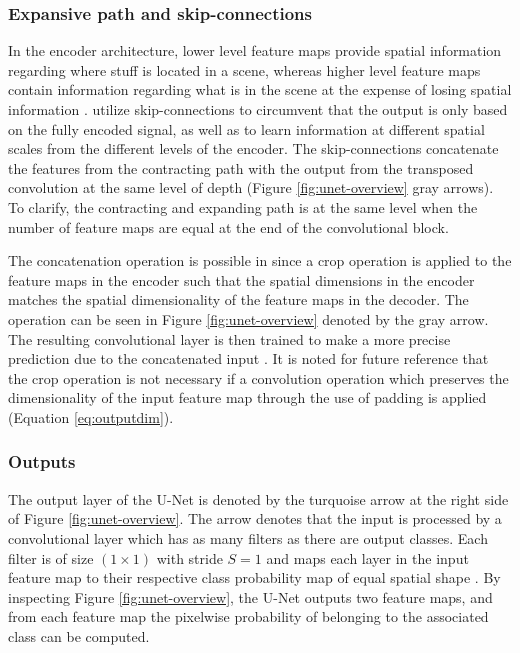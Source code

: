 \documentclass[../main/thesis.tex]{subfiles}
\begin{document}
\subsubsection{Expansive path and skip-connections}
In the encoder architecture, lower level feature maps provide spatial information regarding where stuff is located in a scene, whereas higher level feature maps contain information regarding what is in the scene at the expense of losing spatial information \citep{Long2015}. \citet{Ronneberger2015} utilize skip-connections to circumvent that the output is only based on the fully encoded signal, as well as to learn information at different spatial scales from the different levels of the encoder. The skip-connections concatenate the features from the contracting path with the output from the transposed convolution at the same level of depth (Figure \ref{fig:unet-overview} gray arrows). To clarify, the contracting and expanding path is at the same level when the number of feature maps are equal at the end of the convolutional block. 

The concatenation operation is possible in \citet{Ronneberger2015} since a crop operation is applied to the feature maps in the encoder such that the spatial dimensions in the encoder matches the spatial dimensionality of the feature maps in the decoder. The operation can be seen in Figure \ref{fig:unet-overview} denoted by the gray arrow. The resulting convolutional layer is then trained to make a more precise prediction due to the concatenated input \citep{Ronneberger2015}. It is noted for future reference that the crop operation is not necessary if a convolution operation which preserves the dimensionality of the input feature map through the use of padding is applied (Equation \ref{eq:outputdim}).

\subsubsection{Outputs}
The output layer of the U-Net is denoted by the turquoise arrow at the right side of Figure \ref{fig:unet-overview}. The arrow denotes that the input is processed by a convolutional layer which has as many filters as there are output classes. Each filter is of size $(1 \times 1)$ with stride $S=1$ and maps each layer in the input feature map to their respective class probability map of equal spatial shape \citep{Ronneberger2015}. By inspecting Figure \ref{fig:unet-overview}, the U-Net outputs two feature maps, and from each feature map the pixelwise probability of belonging to the associated class can be computed.
\end{document}
